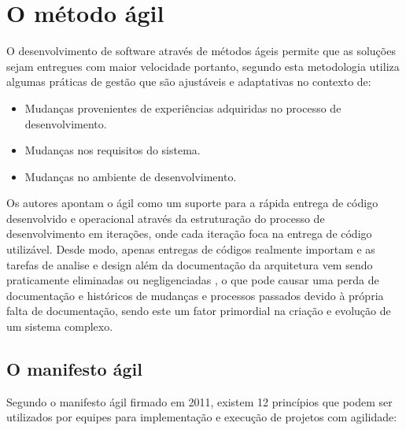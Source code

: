 \section{O método ágil}

O desenvolvimento de software através de métodos ágeis permite que as soluções sejam entregues com maior velocidade portanto, segundo \cite{turk2014limitations} esta metodologia utiliza algumas práticas de gestão que são ajustáveis e adaptativas no contexto de:
    \begin{itemize}
        \item Mudanças provenientes de experiências adquiridas no processo de desenvolvimento.
        \item Mudanças nos requisitos do sistema.
        \item Mudanças no ambiente de desenvolvimento.
    \end{itemize}

Os autores apontam o ágil como um suporte para a rápida entrega de código desenvolvido e operacional através da estruturação do processo de desenvolvimento em iterações, onde cada iteração foca na entrega de código utilizável. Desde modo, apenas entregas de códigos realmente importam e as tarefas de analise e design além da documentação da arquitetura vem sendo praticamente eliminadas ou negligenciadas \cite{waterman2015much}, o que pode causar uma perda de documentação e históricos de mudanças e processos passados devido à própria falta de documentação, sendo este um fator primordial na criação e evolução de um sistema complexo.

\subsection{O manifesto ágil}

Segundo o manifesto ágil \cite{manifestoagil} firmado em 2011, existem 12 princípios que podem ser utilizados por equipes para implementação e execução de projetos com agilidade:

